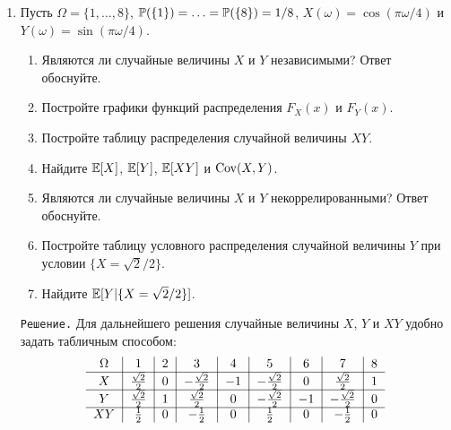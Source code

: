 \documentclass[12pt, a4paper]{article}\usepackage[]{graphicx}\usepackage[]{color}
\begin{document}
\begin{enumerate}
					(c) $\E[X] = \int_{-\infty}^{\infty}xf_X(x)dx = \int_{-3}^{3}x\left(-\frac{x^2}{36} + \tfrac{1}{4}\right)dx = 0$.

					(d)
					\begin{multline}
					\E[X^2] = \int_{-\infty}^{\infty}x^2f_X(x)dx = \int_{-3}^{3}x^2\left(-\frac{x^2}{36} + \tfrac{1}{4}\right)dx = \int_{-3}^{3}\left(-\frac{x^4}{36} + \tfrac{x^2}{4}\right)dx = -\left.\tfrac{x^5}{5\cdot36}\right|_{x=-3}^{x=3} + \left.\tfrac{x^3}{3\cdot4}\right|_{x=-3}^{x=3} = \\
					= \tfrac{9}{5}
					\end{multline}
					Следовательно, $\Var[X] = \tfrac{9}{5}$. $\Box$
					\item %

					Пусть $\Omega = \{1,\ldots,8\}$, $\P(\{1\}) = \ldots = \P(\{8\}) = 1/8$, $X(\omega) = \cos(\pi\omega/4)$ и $Y(\omega) = \sin(\pi\omega/4)$.
					\begin{enumerate}
						\item Являются ли случайные величины $X$ и $Y$ независимыми? Ответ обоснуйте.
						\item Постройте графики функций распределения $F_X(x)$ и $F_Y(x)$.
						\item Постройте таблицу распределения случайной величины $XY$.
						\item Найдите $\E[X]$, $\E[Y]$, $\E[XY]$ и $\Cov(X,Y)$.
						\item Являются ли случайные величины $X$ и $Y$ некоррелированными? Ответ обоснуйте.
						\item Постройте таблицу условного распределения случайной величины $Y$ при условии $\{X = \sqrt{2}/2\}$.
						\item Найдите $\E[Y|\{X = \sqrt{2}/2\}]$.
					\end{enumerate}

					\verb"Решение." Для дальнейшего решения случайные величины $X$, $Y$ и $XY$ удобно задать табличным способом:
					\[
					\begin{tabular}{c|c|c|c|c|c|c|c|c}
					$\Omega$       & $1$                      & $2$     & $3$                      & $4$     & $5$                     & $6$     & $7$                    & $8$    \\ \cline{1-9}
					$X$            & $\frac{\sqrt{2}}{2}$     & $0$     & $-\frac{\sqrt{2}}{2}$    & $-1$    & $-\frac{\sqrt{2}}{2}$   & $0$     & $\frac{\sqrt{2}}{2}$   & $1$    \\ \cline{1-9}
					$Y$            & $\frac{\sqrt{2}}{2}$     & $1$     & $\frac{\sqrt{2}}{2}$     & $0$     & $-\frac{\sqrt{2}}{2}$   & $-1$    & $-\frac{\sqrt{2}}{2}$  & $0$    \\ \cline{1-9}
					$XY$           & $\frac{1}{2}$            & $0$     & $-\frac{1}{2}$           & $0$     & $\frac{1}{2}$           & $0$     & $-\frac{1}{2}$         & $0$    \\
					\end{tabular}
					\]


\end{enumerate}
\end{document}
